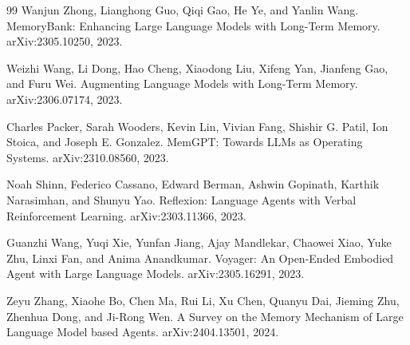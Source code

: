\documentclass[11pt]{article}
\begin{document}
\begin{thebibliography}{99}
Wanjun Zhong, Lianghong Guo, Qiqi Gao, He Ye, and Yanlin Wang.
\newblock MemoryBank: Enhancing Large Language Models with Long-Term Memory.
\newblock arXiv:2305.10250, 2023.

Weizhi Wang, Li Dong, Hao Cheng, Xiaodong Liu, Xifeng Yan, Jianfeng Gao, and Furu Wei.
\newblock Augmenting Language Models with Long-Term Memory.
\newblock arXiv:2306.07174, 2023.

Charles Packer, Sarah Wooders, Kevin Lin, Vivian Fang, Shishir G. Patil, Ion Stoica, and Joseph E. Gonzalez.
\newblock MemGPT: Towards LLMs as Operating Systems.
\newblock arXiv:2310.08560, 2023.

Noah Shinn, Federico Cassano, Edward Berman, Ashwin Gopinath, Karthik Narasimhan, and Shunyu Yao.
\newblock Reflexion: Language Agents with Verbal Reinforcement Learning.
\newblock arXiv:2303.11366, 2023.

Guanzhi Wang, Yuqi Xie, Yunfan Jiang, Ajay Mandlekar, Chaowei Xiao, Yuke Zhu, Linxi Fan, and Anima Anandkumar.
\newblock Voyager: An Open-Ended Embodied Agent with Large Language Models.
\newblock arXiv:2305.16291, 2023.

Zeyu Zhang, Xiaohe Bo, Chen Ma, Rui Li, Xu Chen, Quanyu Dai, Jieming Zhu, Zhenhua Dong, and Ji-Rong Wen.
\newblock A Survey on the Memory Mechanism of Large Language Model based Agents.
\newblock arXiv:2404.13501, 2024.

\end{thebibliography}
\end{document}
